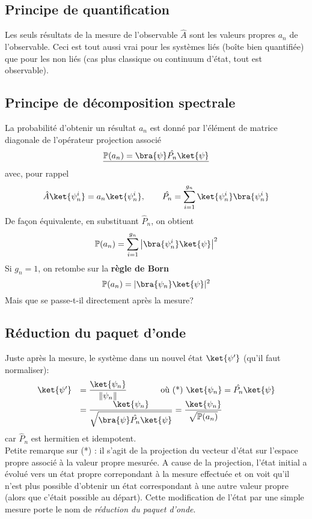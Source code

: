  \subsection{Principe de quantification}
 Les seuls résultats de la mesure de l’observable $\hat{A}$ sont les 
 valeurs propres $a_n$ de l'observable. Ceci est tout aussi vrai pour les 
 systèmes liés (boîte bien quantifiée) que pour les non liés (cas plus classique ou 
 continuum d'état, tout est observable).
 
 \subsection{Principe de décomposition spectrale}
 La probabilité d'obtenir un résultat $a_n$ est donné par l'élément de 
 matrice diagonale de l'opérateur projection associé
 \begin{equation}
 \underline{\mathbb{P}(a_n) = \bra{\psi}\hat{P_n}\ket{\psi}}
 \end{equation}
 avec, pour rappel 
 \begin{equation}
 \hat{A}\ket{\psi_n^i} = a_n\ket{\psi_n^i},\qquad \hat{P_n} = \sum_{i=1}^{g_n} 
 \ket{\psi_n^i}\bra{\psi_n^i}
 \end{equation}
 De façon équivalente, en substituant $\hat{P}_n$, on obtient
 \begin{equation}
 \mathbb{P}(a_n) = \sum_{i=1}^{g_n} \left|\bra{\psi_n^i}\ket{\psi}\right|^2
 \end{equation}
 Si $g_n = 1$, on retombe sur la \textbf{règle de Born}
 \begin{equation}
 \mathbb{P}(a_n) = |\bra{\psi_n}\ket{\psi}|^2
 \end{equation}
 Mais que se passe-t-il directement après la mesure?
 
 \subsection{Réduction du paquet d'onde}
 Juste après la mesure, le système dans un nouvel état $\ket{\psi'}$ (qu'il 
 faut normaliser):
 \begin{equation}
 \begin{array}{ll}
 \ket{\psi'} &= \dfrac{\ket{\psi_n}}{\|\psi_n\|}\qquad\qquad \text{où (*) } \ket{\psi_n} 
 = \hat{P_n}\ket{\psi}\\
 &= \dfrac{\ket{\psi_n}}{\sqrt{\bra{\psi}\hat{P_n}\ket{\psi}}} = \dfrac{\ket{\psi_n}}{
 \sqrt{\mathbb{P}(a_n)}}
 \end{array}
 \end{equation}
 car $\hat{P}_n$ est hermitien et idempotent.\\
 Petite remarque sur (*) : il s'agit de la projection du vecteur d'état sur l'espace propre
 associé à la valeur propre mesurée. A cause de la projection, l'état initial a évolué vers un état
 propre correpondant à la mesure effectuée et on voit qu'il n'est plus possible d'obtenir un état
 correspondant à une autre valeur propre (alors que c'était possible au départ). Cette modification
 de l'état par une simple mesure porte le nom de \textit{réduction du paquet d'onde}.
 
